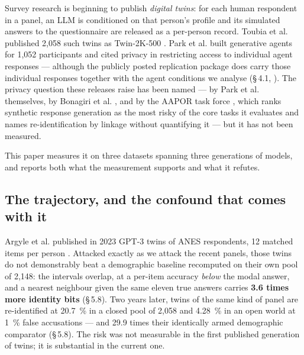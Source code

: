 \documentclass[sigconf,anonymous,review]{acmart}
\begin{document}
Survey research is beginning to publish \textit{digital twins}: for each human respondent in a panel, an LLM is conditioned on that person's profile and its simulated answers to the questionnaire are released as a per-person record. Toubia et al. published 2,058 such twins as Twin-2K-500 \cite{toubia2025twin2k500}. Park et al. built generative agents for 1,052 participants and cited privacy in restricting access to individual agent responses \cite{park2024agents} --- although the publicly posted replication package does carry those individual responses together with the agent conditions we analyse (\S\,4.1, \ethicsname{}). The privacy question these releases raise has been named --- by Park et al. themselves, by Bonagiri et al. \cite{bonagiri2026cognitive}, and by the AAPOR task force \cite{aapor2026responsibleai}, which ranks synthetic response generation as the most risky of the core tasks it evaluates and names re-identification by linkage without quantifying it --- but it has not been measured.

This paper measures it on three datasets spanning three generations of models, and reports both what the measurement supports and what it refutes.

\subsection{The trajectory, and the confound that comes with it}

Argyle et al. published in 2023 GPT-3 twins of ANES respondents, 12 matched items per person \cite{argyle2023outofone}. Attacked exactly as we attack the recent panels, those twins do not demonstrably beat a demographic baseline recomputed on their own pool of 2,148: the intervals overlap, at a per-item accuracy \textit{below} the modal answer, and a nearest neighbour given the same eleven true answers carries \textbf{3.6 times more identity bits} (\S\,5.8). Two years later, twins of the same kind of panel are re-identified at 20.7~\% in a closed pool of 2,058 and 4.28~\% in an open world at 1~\% false accusations --- and 29.9 times their identically armed demographic comparator (\S\,5.8). The risk was not measurable in the first published generation of twins; it is substantial in the current one.
\end{document}
